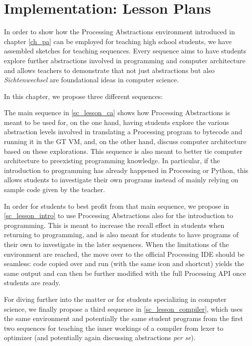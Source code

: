 
\chapter{Implementation: Lesson Plans} \label{ch_teaching}

In order to show how the Processing Abstractions environment introduced in chapter \ref{ch_pa} can be employed for teaching high school students, we have assembled sketches for teaching sequences. Every sequence aims to have students explore further abstractions involved in programming and computer architecture and allows teachers to demonstrate that not just abstractions but also \emph{Sichtenwechsel} are foundational ideas in computer science.

In this chapter, we propose three different sequences:

The main sequence in \ref{sc_lesson_ca} shows how Processing Abstractions is meant to be used for, on the one hand, having students explore the various abstraction levels involved in translating a Processing program to bytecode and running it in the \ac{GT} \ac{VM}, and, on the other hand, discuss computer architecture based on these explorations. This sequence is also meant to better tie computer architecture to preexisting programming knowledge. In particular, if the introduction to programming has already happened in Processing or Python, this allows students to investigate their own programs instead of mainly relying on sample code given by the teacher.

In order for students to best profit from that main sequence, we propose in \ref{sc_lesson_intro} to use Processing Abstractions also for the introduction to programming. This is meant to increase the recall effect in students when returning to programming, and is also meant for students to have programs of their own to investigate in the later sequences. When the limitations of the environment are reached, the move over to the official Processing \ac{IDE} should be seamless: code copied over and run (with the same icon and shortcut) yields the same output and can then be further modified with the full Processing \ac{API} once students are ready.

For diving further into the matter or for students specializing in computer science, we finally propose a third sequence in \ref{sc_lesson_compiler}, which uses the same environment and potentially the same student programs from the first two sequences for teaching the inner workings of a compiler from lexer to optimizer (and potentially again discussing abstractions \emph{per se}).

